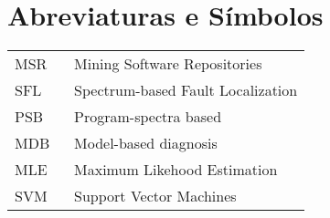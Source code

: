 \chapter*{Abreviaturas e Símbolos}

\begin{flushleft}
\begin{tabular}{l p{0.8\linewidth}}
MSR 	& Mining Software Repositories\\
SFL 	& Spectrum-based Fault Localization \\
PSB		& Program-spectra based\\
MDB		& Model-based diagnosis\\
MLE 	& Maximum Likehood Estimation\\
SVM 	& Support Vector Machines\\
\end{tabular}
\end{flushleft}

